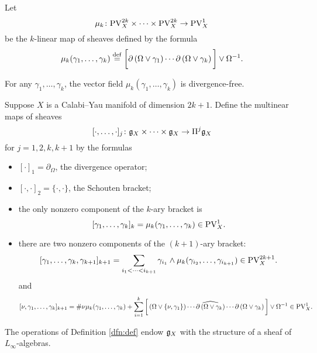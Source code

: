 \documentclass[11pt]{amsart}
\numberwithin{equation}{section}
\def\PV{{\rm PV}}
\begin{document}
\begin{dfn}
Let
\[
\mu_k \colon \PV^{2k}_X \times \cdots \times \PV^{2k}_X \to \PV^1_X 
\]
be the $k$-linear map of sheaves defined by the formula
\[
\mu_k (\gamma_1,\ldots, \gamma_k) \overset{\rm def}{=} \bigg[\partial \left(\Omega \vee \gamma_1\right)\cdots \partial \left(\Omega \vee \gamma_k\right)\bigg] \vee \Omega^{-1} .
\]
\end{dfn}

\begin{lem}
For any $\gamma_1,\ldots, \gamma_k$, the vector field $\mu_k(\gamma_1,\ldots, \gamma_k)$ is divergence-free. 
\end{lem}

\begin{dfn}
\label{dfn:def}
Suppose $X$ is a Calabi--Yau manifold of dimension $2k+1$. 
Define the multinear maps of sheaves
\[
[\cdot, \ldots, \cdot]_j \colon \mathfrak g_X \times \cdots \times \mathfrak g_X \to \Pi^j \mathfrak g_X
\]
for $j=1,2,k,k+1$ by the formulas
\begin{itemize}
\item $[\cdot]_1 = \partial_\Omega$, the divergence operator;
\item $[\cdot,\cdot]_2 = \{\cdot,\cdot\}$, the Schouten bracket;
\item the only nonzero component of the $k$-ary bracket is
\[
[\gamma_1,\ldots, \gamma_k]_k = \mu_k(\gamma_1,\ldots, \gamma_k) \in \PV^1_X .
\]
\item there are two nonzero components of the $(k+1)$-ary bracket:
\[
[\gamma_1,\ldots, \gamma_k, \gamma_{k+1}]_{k+1} = \sum_{i_1 < \cdots < i_{k+1}} \gamma_{i_1} \wedge \mu_k(\gamma_{i_2},\ldots, \gamma_{i_{k+1}}) \in \PV^{2k+1}_X .
\]
and 
\[
[\nu, \gamma_1, \ldots, \gamma_k]_{k+1} = \# \nu \mu_k (\gamma_1,\ldots, \gamma_k) + \sum_{i=1}^k \bigg[\left(\Omega \vee \{\nu, \gamma_1\}\right)\cdots \Hat{\partial \left(\Omega \vee \gamma_k\right)} \cdots \partial \left(\Omega \vee \gamma_k\right) \bigg] \vee \Omega^{-1} \in \PV^{1}_X .
\]
\end{itemize}
\end{dfn}

\begin{thm}
The operations of Definition \ref{dfn:def} endow $\mathfrak g_X$ with the structure of a sheaf of $L_\infty$-algebras.
\end{thm}
\end{document}
